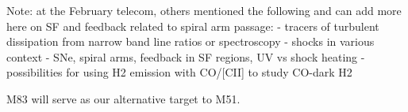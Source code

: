 \documentclass[12pt]{article}
\begin{document}
Note: at the February telecom, others mentioned the following and can add more here on SF and feedback related to spiral arm passage:
        - tracers of turbulent dissipation from narrow band line ratios or spectroscopy
        - shocks in various context - SNe, spiral arms, feedback in SF regions, UV vs shock heating
        - possibilities for using H2 emission with CO/[CII] to study CO-dark H2


%

\describeobservations   %




%

\alttargets   %
M83 will serve as our alternative target to M51.  


%
\end{document}

